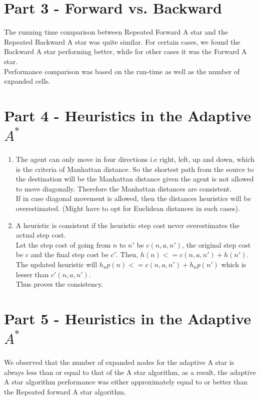 \documentclass{article}
\begin{document}
\section*{Part 3 - Forward vs. Backward}
\begin{flushleft}
The running time comparison between Repeated Forward A star and the Repeated Backward A star was quite similar. For certain cases, we found the Backward A star performing better, while for other cases it was the Forward A star.\\ Performance comparison was based on the run-time as well as the number of expanded cells.
\end{flushleft}


\section*{Part 4 - Heuristics in the Adaptive $A^*$}
\begin{enumerate}
\item 
\begin{flushleft}
The agent can only move in four directions i.e right, left, up and down, which is the criteria of Manhattan distance. So the shortest path from the source to the destination will be the Manhattan distance given the agent is not allowed to move diagonally. Therefore the Manhattan distances are consistent.\\
If in case diagonal movement is allowed, then the distances heuristics will be overestimated. (Might have to opt for Euclidean distances in such cases).
\end{flushleft}
\item
\begin{flushleft}
A heuristic is consistent if the heuristic step cost never overestimates the actual step cost. \\
Let the step cost of going from $n$ to $n'$ be $c(n,a,n')$, the original step cost be $c$ and the final step cost be $c'$. Then, $h(n) <= c(n,a,n')+h(n')$. \\ The updated heuristic will $h_up(n) <= c(n,a,n')+h_up(n')$ which is lesser than $c'(n,a,n')$. \\ Thus proves the consistency.
\end{flushleft}
\end{enumerate}

\section*{Part 5 - Heuristics in the Adaptive $A^*$}
\begin{flushleft}
We observed that the number of expanded nodes for the adaptive A star is always less than or equal to that of the A star algorithm, as a result, the adaptive A star algorithm performance was either approximately equal to or better than the Repeated forward A star algorithm.
\end{flushleft}
\newpage
\end{document}
